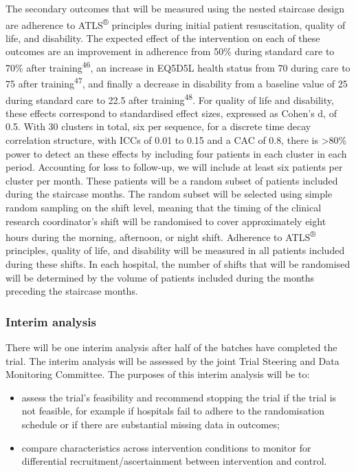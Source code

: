 \documentclass[
]{scrartcl}
\providecommand{\tightlist}{%
  \setlength{\itemsep}{0pt}\setlength{\parskip}{0pt}}\usepackage{longtable,booktabs,array}
\begin{document}
The secondary outcomes that will be measured using the nested staircase
design are adherence to ATLS\textsuperscript{®} principles during
initial patient resuscitation, quality of life, and disability. The
expected effect of the intervention on each of these outcomes are an
improvement in adherence from 50\% during standard care to 70\% after
training\textsuperscript{46}, an increase in EQ5D5L health status from
70 during care to 75 after training\textsuperscript{47}, and finally a
decrease in disability from a baseline value of 25 during standard care
to 22.5 after training\textsuperscript{48}. For quality of life and
disability, these effects correspond to standardised effect sizes,
expressed as Cohen's d, of 0.5. With 30 clusters in total, six per
sequence, for a discrete time decay correlation structure, with ICCs of
0.01 to 0.15 and a CAC of 0.8, there is \textgreater80\% power to detect
an these effects by including four patients in each cluster in each
period. Accounting for loss to follow-up, we will include at least six
patients per cluster per month. These patients will be a random subset
of patients included during the staircase months. The random subset will
be selected using simple random sampling on the shift level, meaning
that the timing of the clinical research coordinator's shift will be
randomised to cover approximately eight hours during the morning,
afternoon, or night shift. Adherence to ATLS\textsuperscript{®}
principles, quality of life, and disability will be measured in all
patients included during these shifts. In each hospital, the number of
shifts that will be randomised will be determined by the volume of
patients included during the months preceding the staircase months.

\hypertarget{interim-analysis}{%
\subsubsection{Interim analysis}\label{interim-analysis}}

There will be one interim analysis after half of the batches have
completed the trial. The interim analysis will be assessed by the joint
Trial Steering and Data Monitoring Committee. The purposes of this
interim analysis will be to:

\begin{itemize}
\tightlist
\item
  assess the trial's feasibility and recommend stopping the trial if the
  trial is not feasible, for example if hospitals fail to adhere to the
  randomisation schedule or if there are substantial missing data in
  outcomes;
\item
  compare characteristics across intervention conditions to monitor for
  differential recruitment/ascertainment between intervention and
  control.
\end{itemize}
\end{document}
